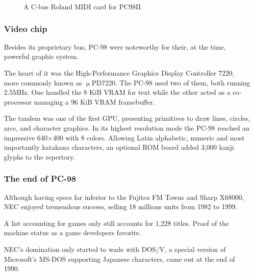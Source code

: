 \begin{figure}[H]

\caption*{A C-bus Roland MIDI card for PC98II}
\end{figure}



\subsubsection{Video chip}
Besides its proprietary bus, PC-98 were noteworthy for their, at the time, powerful graphic system.

The heart of it was the High-Performance Graphics Display Controller 7220, more commonly known as $\upmu$PD7220. The PC-98 used two of them, both running 2.5MHz. One handled the 8 KiB VRAM for text while the other acted as a co-processor managing a 96 KiB VRAM framebuffer.

The tandem was one of the first GPU, presenting primitives to draw lines, circles, arcs, and character graphics. In its highest resolution mode the PC-98 reached an impressive 640×400 with 8 colors. Allowing Latin alphabetic, numeric and most importantly katakana characters, an optional ROM board added 3,000 kanji glyphs to the repertory.   

\subsubsection{The end of PC-98}

Although having specs far inferior to the Fujitsu FM Towns and Sharp X68000, NEC enjoyed tremendous success, selling 18 millions units from 1982 to 1999.


A list accounting for games only still accounts for 1,228 titles. Proof of the machine status as a game developers favorite.

NEC's domination only started to wade with DOS/V, a special version of Microsoft's MS-DOS supporting Japanese characters, came out at the end of 1990.




